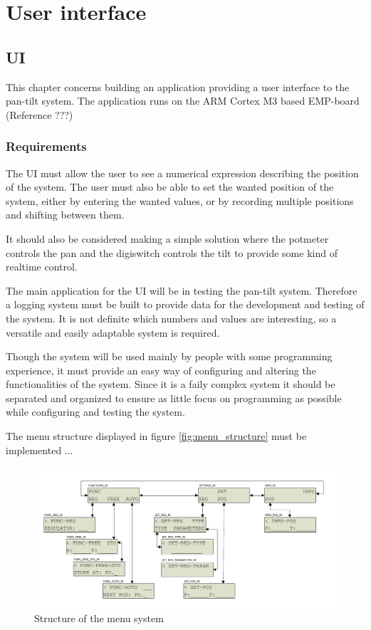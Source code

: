 \chapter{User interface}\label{chap:ui}

\section{UI}
This chapter concerns building an application providing a user interface to the
pan-tilt system. The application runs on the ARM Cortex M3 based EMP-board
(Reference ???)

\subsection{Requirements}
The UI must allow the user to see a numerical expression
describing the position of the system. The user must also be able to set the
wanted position of the system, either by entering the wanted values, or by
recording multiple positions and shifting between them.

It should also be considered making a simple solution where the potmeter
controls the pan and the digiswitch controls the tilt to provide some kind of
realtime control.

The main application for the UI will be in testing the pan-tilt system.
Therefore a logging system must be built to provide data for the development
and testing of the system. It is not definite which numbers and values are
interesting, so a versatile and easily adaptable system is required.

Though the system will be used mainly by people with some programming
experience, it must provide an easy way of configuring and altering the functionalities of the system. Since it is a faily complex system it should be separated and organized to ensure as little focus on programming as possible while configuring and testing the system.

The  menu structure displayed in figure \ref{fig:menu_structure} must be implemented ...

\begin{figure}[htb]
	\centering
	\includegraphics[width=\textwidth,trim=0 0 0 0]{graphics/menu_structure.pdf} 
	\caption{Structure of the menu system}
	\label{fig:ui_task_diagram}
\end{figure}

